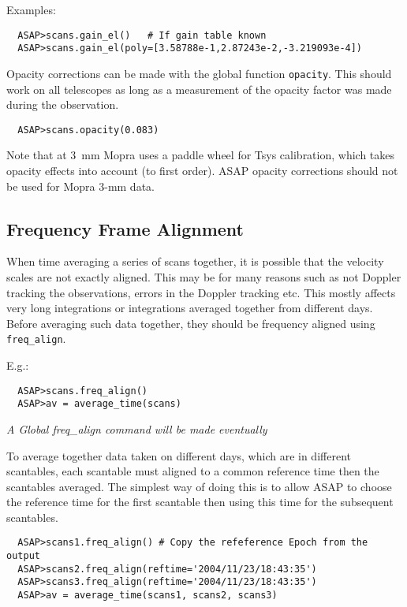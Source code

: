 \documentclass[11pt]{article}
\newcommand{\cmd}[1]{{\tt #1}}
\begin{document}
Examples:

\begin{verbatim}
  ASAP>scans.gain_el()   # If gain table known
  ASAP>scans.gain_el(poly=[3.58788e-1,2.87243e-2,-3.219093e-4])
\end{verbatim}

Opacity corrections can be made with the global
function \cmd{opacity}. This should work on all telescopes as long as
a measurement of the opacity factor was made during the observation.

\begin{verbatim}
  ASAP>scans.opacity(0.083)
\end{verbatim}

Note that at 3~mm Mopra uses a paddle wheel for Tsys calibration,
which takes opacity effects into account (to first order). ASAP
opacity corrections should not be used for Mopra 3-mm data.

\subsection{Frequency Frame Alignment}
\label{sec:freqalign}

When time
averaging a series of scans together, it is possible that the velocity
scales are not exactly aligned.  This may be for many reasons such as
not Doppler tracking the observations, errors in the Doppler tracking
etc.  This mostly affects very long integrations or integrations
averaged together from different days.  Before averaging such data
together, they should be frequency aligned using \cmd{freq\_align}.

E.g.:

\begin{verbatim}
  ASAP>scans.freq_align()
  ASAP>av = average_time(scans)
\end{verbatim}

{\em A Global freq\_align command will be made eventually}

To average together data taken on different days, which are in
different scantables, each scantable must aligned to a common
reference time then the scantables averaged. The simplest way of
doing this is to allow ASAP to choose the reference time for the first
scantable then using this time for the subsequent scantables.

\begin{verbatim}
  ASAP>scans1.freq_align() # Copy the refeference Epoch from the output
  ASAP>scans2.freq_align(reftime='2004/11/23/18:43:35')
  ASAP>scans3.freq_align(reftime='2004/11/23/18:43:35')
  ASAP>av = average_time(scans1, scans2, scans3)
\end{verbatim}
\end{document}

